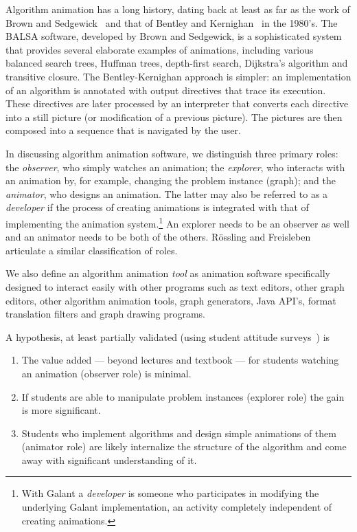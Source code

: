 Algorithm animation has a long history, dating back at least as far as the
work of Brown and Sedgewick~\cite{1988-Computer-Brown,1985-IEEE_Software-Brown}
and that of Bentley and Kernighan~\cite{1987-Animation-Bentley} in the 1980's.
The BALSA software, developed by Brown and Sedgewick, is a sophisticated system that provides several
elaborate examples of animations, including various balanced search trees,
Huffman trees, depth-first search, Dijkstra's algorithm and transitive closure.
The Bentley-Kernighan approach is simpler: an implementation of an algorithm is annotated with output directives that trace its execution.
These directives are later processed by an interpreter that
converts each directive into a still picture (or modification of a previous
picture). The pictures are then composed into a sequence that is navigated by the user.

In discussing algorithm animation software,
we distinguish three primary roles: the \emph{observer}, who simply
watches an animation; the \emph{explorer}, who interacts with an animation by,
for example, changing the problem instance (graph); and the \emph{animator}, who
designs an animation. The latter may also be referred to as a
\emph{developer} if the process of creating animations is integrated with
that of implementing the animation system.\footnote{
  With Galant a \emph{developer} is someone who participates in modifying the
  underlying Galant implementation, an activity completely independent of creating
  animations.
}
An explorer needs to be an observer as well
and an animator needs to be both of
the others.
R\"ossling and Freisleben~\cite{2002-JVLC-Roessling} articulate a similar
classification of roles.

We also define an algorithm animation \emph{tool} as animation software specifically designed to interact easily with other programs such as
text editors, other graph editors, other algorithm animation tools,
graph generators, Java API's, format translation filters and
graph drawing programs.

A hypothesis, at least partially validated (using student attitude
surveys~\cite{1997-SIGCSE-Stasko}) is
\begin{enumerate}
  \item \label{item:demonstration}
    The value added --- beyond lectures and textbook
    --- for students watching an animation (observer role)
    is minimal.
  \item \label{item:interactive}
    If students are able to manipulate problem instances (explorer role)
    the gain is more significant.
  \item \label{item:creative}
    Students who implement algorithms and design simple animations of them
    (animator role) are likely internalize the structure of the algorithm and
    come away with significant understanding of it.
\end{enumerate}

